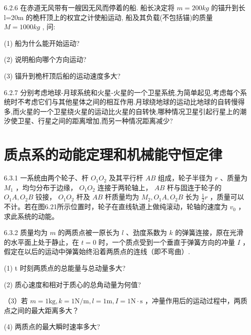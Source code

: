 \begin{problem}{6.2.6}
在赤道无风带有一艘因无风而停着的船. 船长决定将 $m=200kg$ 的锚升到长 l=20m 的桅杆顶上的权宜之计使船运动, 船及其负载(不包括锚)的质量 $M=1000kg$ , 问:

(1) 船为什么能开始运动?

(2) 说明船向哪个方向运动?

(3) 锚升到桅杆顶后船的运动速度多大?
\end{problem}
\clearpage


\begin{problem}{6.2.7}
分别考虑地球-月球系统和火星-火星的一个卫星系统,为简单起见,考虑每个系统时不考虑它们与其他星体之间的相互作用.月球绕地球的运动比地球的自转慢得多,而火星的一个卫星绕火星的运动比火星的自转快,哪种情况卫星引起行星上的潮汐使卫星、行星之间的距离增加,而另一种情况距离减少?
\end{problem}
\clearpage


\section{质点系的动能定理和机械能守恒定律}

\begin{problem}{6.3.1}
一系统由两个轮子、杆 $O_{1}O_{2}$ 及其平行杆 $AB$ 组成，轮子半径为 $r$ 、质量为 $M_{1}$ ，均匀分布于边缘， $O_{1}O_{2}$ 连接于两轮轴上， $AB$ 杆与固连于轮子的 $O_{1}A, O_{2}B$ 铰接， $O_{1}O_{2}$ 杆及 $AB$ 杆质量均为 $M_{2}, O_{1}A, O_{2}B$ 长为 $\frac{1}{2} r$ ，质量可以不计。若在图6.21所示位置时，轮子在直线轨道上做纯滚动，轮轴的速度为 $v_{0}$ ，求此系统的动能。
\begin{center}

\end{center}
\end{problem}
\clearpage


\begin{problem}{6.3.2}
质量均为 $m$ 的两质点被一原长为 $l$ 、劲度系数为 $k$ 的弹簧连接，原在光滑的水平面上处于静止，在 $t = 0$ 时，一个质点受到一个垂直于弹簧方向的冲量 $I$ ，假定在以后的运动中弹簧始终沿着两质点的连线（即不弯曲）.

(1) t 时刻两质点的总能量与总动量多大?

(2) 质心速度和相对于质心的总角动量为何值?

（3）若 $m = 1\mathrm{kg}, k = 1\mathrm{N / m}, l = 1\mathrm{m}, I = 1\mathrm{N} \cdot \mathrm{s}$ ，冲量作用后的运动过程中，两质点之间的最大距离多大？

(4) 两质点的最大瞬时速率多大?
\end{problem}
\clearpage


